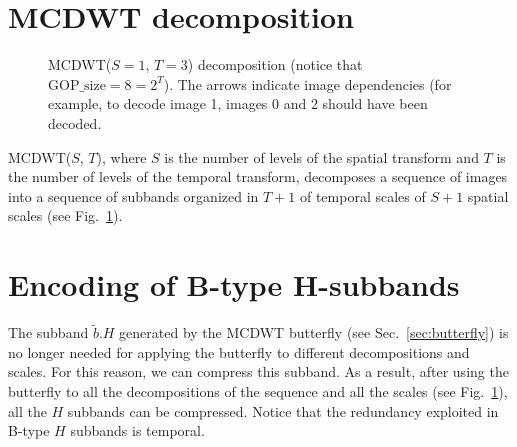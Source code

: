 
\section{MCDWT decomposition}

\begin{figure}
  \centering %
  \caption{MCDWT($S=1$, $T=3$) decomposition (notice that
    $\text{GOP\_size}=8=2^T$). The arrows indicate image dependencies
    (for example, to decode image 1, images 0 and 2 should have been
    decoded.} %
  \label{fig:MCDWT_decomposition}
\end{figure}

MCDWT($S$, $T$), where $S$ is the number of levels of the spatial
transform and $T$ is the number of levels of the temporal transform,
decomposes a sequence of images into a sequence of subbands organized
in $T+1$ of temporal scales of $S+1$ spatial scales (see
Fig.~\ref{fig:MCDWT_decomposition}).


\section{Encoding of B-type H-subbands}

The subband $\tilde{b}.H$ generated by the MCDWT butterfly (see
Sec.~\ref{sec:butterfly}) is no longer needed for applying the
butterfly to different decompositions and scales. For this reason, we
can compress this subband. As a result, after using the butterfly to
all the decompositions of the sequence and all the scales (see
Fig.~\ref{fig:MCDWT_decomposition}), all the $H$ subbands can be
compressed. Notice that the redundancy exploited in B-type $H$
subbands is temporal.

